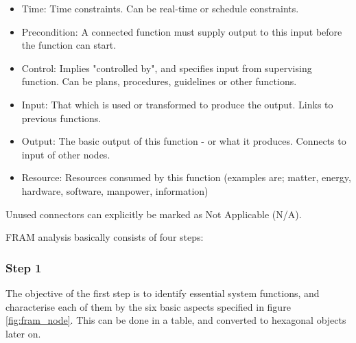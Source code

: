 \begin{itemize}
  \item Time: Time constraints. Can be real-time or schedule constraints.

  \item Precondition: A connected function must supply output to this input before the function can start.

  \item Control: Implies "controlled by", and specifies input from supervising function. Can be plans, procedures, guidelines or other functions.
  
  \item Input: That which is used or transformed to produce the output. Links to previous functions.

  \item Output: The basic output of this function - or what it produces. Connects to input of other nodes.
  \item Resource: Resources consumed by this function (examples are; matter, energy, hardware, software, manpower, information)
\end{itemize} 
Unused connectors can explicitly be marked as Not Applicable (N/A).



FRAM analysis basically consists of four steps:

\subsubsection*{Step 1}
The objective of the first step is to identify essential system functions, and characterise each of them by the six basic aspects specified in figure \ref{fig:fram_node}. This can be done in a table, and converted to hexagonal objects later on.
